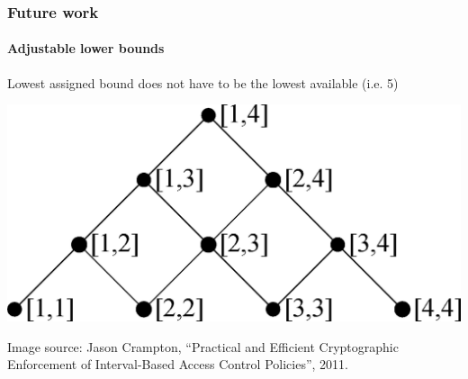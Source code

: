 \documentclass{beamer}
\begin{document}
  \begin{frame}
  	\frametitle{Future work}
  	\framesubtitle{Adjustable lower bounds}
  	Lowest assigned bound does not have to be the lowest available (i.e. 5)
  	\begin{center}
 	 	\includegraphics[scale=0.1]{images/lowerBounds/hasse.pdf}
  	\end{center}
  	\vspace*{1cm}
  	\tiny{Image source: Jason Crampton, ``Practical and Efficient Cryptographic Enforcement of Interval-Based Access Control Policies'', 2011.}

  \end{frame}
  
\end{document}
